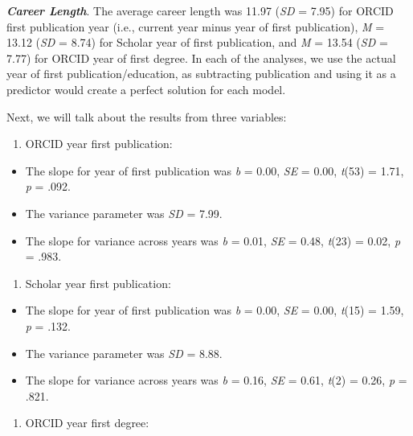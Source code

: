 \documentclass[
  man]{apa6}
\providecommand{\tightlist}{%
  \setlength{\itemsep}{0pt}\setlength{\parskip}{0pt}}
\begin{document}
\textbf{\emph{Career Length}}. The average career length was 11.97 (\emph{SD} = 7.95) for ORCID first publication year (i.e., current year minus year of first publication), \emph{M} = 13.12 (\emph{SD} = 8.74) for Scholar year of first publication, and \emph{M} = 13.54 (\emph{SD} = 7.77) for ORCID year of first degree. In each of the analyses, we use the actual year of first publication/education, as subtracting publication and using it as a predictor would create a perfect solution for each model.

Next, we will talk about the results from three variables:

\begin{enumerate}
\def\labelenumi{\arabic{enumi})}
\tightlist
\item
  ORCID year first publication:
\end{enumerate}

\begin{itemize}
\tightlist
\item
  The slope for year of first publication was \emph{b} = 0.00, \emph{SE} = 0.00, \emph{t}(53) = 1.71, \emph{p} = .092.
\item
  The variance parameter was \emph{SD} = 7.99.
\item
  The slope for variance across years was \emph{b} = 0.01, \emph{SE} = 0.48, \emph{t}(23) = 0.02, \emph{p} = .983.
\end{itemize}

\begin{enumerate}
\def\labelenumi{\arabic{enumi})}
\setcounter{enumi}{1}
\tightlist
\item
  Scholar year first publication:
\end{enumerate}

\begin{itemize}
\tightlist
\item
  The slope for year of first publication was \emph{b} = 0.00, \emph{SE} = 0.00, \emph{t}(15) = 1.59, \emph{p} = .132.
\item
  The variance parameter was \emph{SD} = 8.88.
\item
  The slope for variance across years was \emph{b} = 0.16, \emph{SE} = 0.61, \emph{t}(2) = 0.26, \emph{p} = .821.
\end{itemize}

\begin{enumerate}
\def\labelenumi{\arabic{enumi})}
\setcounter{enumi}{2}
\tightlist
\item
  ORCID year first degree:
\end{enumerate}
\end{document}
